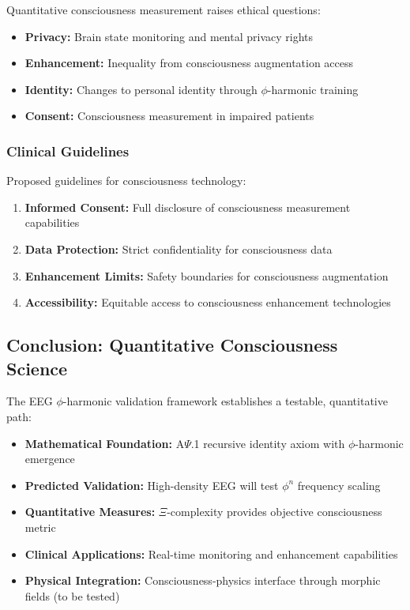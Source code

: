 Quantitative consciousness measurement raises ethical questions:
\begin{itemize}
 \item \textbf{Privacy:} Brain state monitoring and mental privacy rights
 \item \textbf{Enhancement:} Inequality from consciousness augmentation access
 \item \textbf{Identity:} Changes to personal identity through $\phi$-harmonic training
 \item \textbf{Consent:} Consciousness measurement in impaired patients
\end{itemize}

\subsubsection{Clinical Guidelines}

Proposed guidelines for consciousness technology:
\begin{enumerate}
 \item \textbf{Informed Consent:} Full disclosure of consciousness measurement capabilities
 \item \textbf{Data Protection:} Strict confidentiality for consciousness data
 \item \textbf{Enhancement Limits:} Safety boundaries for consciousness augmentation
 \item \textbf{Accessibility:} Equitable access to consciousness enhancement technologies
\end{enumerate}

\subsection{Conclusion: Quantitative Consciousness Science}

The EEG $\phi$-harmonic validation framework establishes a testable, quantitative path:

\begin{itemize}
 \item \textbf{Mathematical Foundation:} A$\Psi$.1 recursive identity axiom with $\phi$-harmonic emergence
 \item \textbf{Predicted Validation:} High-density EEG will test $\phi^n$ frequency scaling
 \item \textbf{Quantitative Measures:} $\Xi$-complexity provides objective consciousness metric
 \item \textbf{Clinical Applications:} Real-time monitoring and enhancement capabilities
 \item \textbf{Physical Integration:} Consciousness-physics interface through morphic fields (to be tested)
\end{itemize}